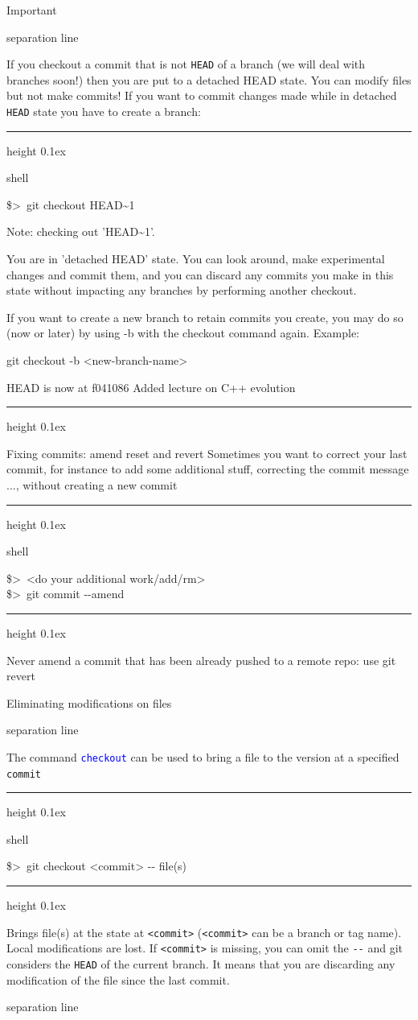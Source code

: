 \documentclass[hyperref={colorlinks}]{beamer}
\newenvironment{shell}{%
\footnotesize\flushleft\hrule height 0.1ex
\tt\begin{beamercolorbox}[sep=1ex,left]{shell}%
}{%
\end{beamercolorbox}
\hrule height 0.1ex
\endflushleft\par
}
\newcommand*{\psone}[1][ant]{\$>~}
\newcommand{\titleline}[1][0.025cm]{%
\begin{beamercolorbox}[wd=\paperwidth,ht=#1,center]{separation line}%
\end{beamercolorbox}%
}
\begin{document}
\begin{frame}{Important}
  \titleline
  If you checkout a commit that is not \texttt{HEAD} of a branch (we
  will deal with branches soon!) then you are put to a \alert{detached
    HEAD state}. You can modify files but not make
  commits! If you want to commit changes made while in detached \texttt{HEAD} state you have to create a branch:
  \small
  \begin{shell}
\psone git checkout HEAD\textasciitilde{}1

Note: checking out 'HEAD\textasciitilde{}1'.

You are in 'detached HEAD' state. You can look around, make experimental
changes and commit them, and you can discard any commits you make in this
state without impacting any branches by performing another checkout.

If you want to create a new branch to retain commits you create, you may
do so (now or later) by using -b with the checkout command again. Example:

  git checkout -b <new-branch-name>

HEAD is now at f041086 Added lecture on C++ evolution
  \end{shell}

\end{frame}
\begin{frame}{Fixing commits: amend reset and revert}
Sometimes you want to correct your \alert{last commit}, for instance to add some additional stuff, correcting the commit message ..., without creating a new commit
\begin{shell}
\psone <do your additional work/add/rm>\\
\psone git commit -{}-amend
\end{shell}
\smallskip

\alert{Never amend a commit that has been already pushed to a remote repo: use git revert}
\end{frame}

\begin{frame}{Eliminating modifications on files}
  \titleline
  The command \textcolor{blue}{\texttt{checkout}} can be used to bring a file to the version at a specified \texttt{commit}
\begin{shell}
\psone git checkout <commit> -{}- file(s)
\end{shell}
Brings file(s) at the state at \texttt{<commit>} (\texttt{<commit>} can be a branch or tag name).
\alert{Local modifications are lost}. If \texttt{<commit>} is missing, you can omit the \texttt{-{}-} and git considers the \texttt{HEAD} of the current branch. It means that you are discarding \alert{any modification} of the file since the last commit.
\titleline
\end{frame}
\end{document}
